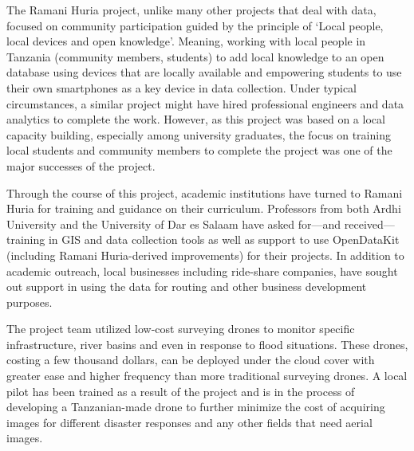 \documentclass[a4paper,12pt,twoside]{article}
\begin{document}
\begin{multicols}{2}

The Ramani Huria project, unlike many other projects that deal with data, focused on community participation guided by the principle of ‘Local people, local devices and open knowledge'. Meaning,  working with local people in Tanzania (community members, students) to add local knowledge to an open database using devices that are locally available and empowering students to use  their own smartphones as a key device in data collection. Under typical circumstances, a similar project might have hired professional engineers and data analytics to complete the work. However, as this project was based on a local capacity building, especially among university graduates, the focus on training local students and community members to complete the project was one of the major successes of the project.

Through the course of this project, academic institutions have turned to Ramani Huria for training and guidance on their curriculum. Professors from both Ardhi University and the University of Dar es Salaam have asked for—and received—training in GIS and data collection tools as well as support to use OpenDataKit (including Ramani Huria-derived improvements) for their projects. In addition to academic outreach, local businesses including ride-share companies, have sought out support in using the data for routing and other business development purposes. 

The project team utilized low-cost surveying drones to monitor specific infrastructure, river basins and even in response to flood situations. These drones, costing a few thousand dollars, can be deployed under the cloud cover with greater ease and higher frequency than more traditional surveying drones.   A local pilot has been trained as a result of the project and is in the process of developing a Tanzanian-made drone to further minimize the cost of acquiring images for different disaster responses and any other fields that need aerial images.
\end{multicols}
\end{document}
